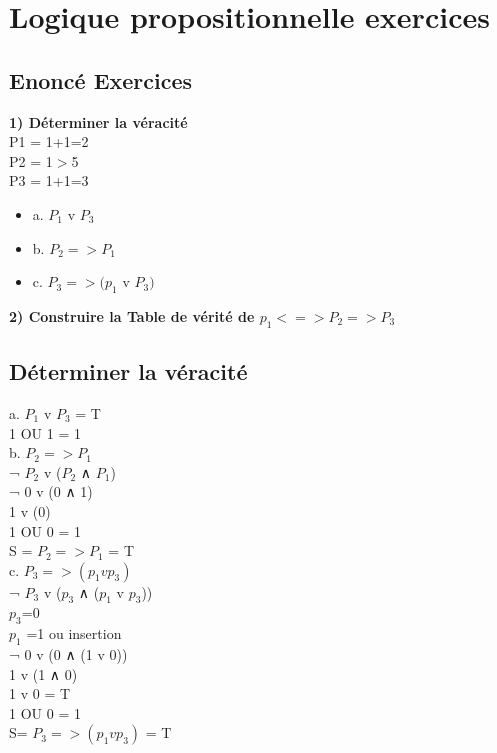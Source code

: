 \newpage

\chapter{Logique propositionnelle exercices}
\vspace{5mm} %

\section{Enoncé Exercices}

\textbf{1) Déterminer la véracité} \\

P1 = 1+1=2  \\
P2 = 1$>$5 \\
P3 = 1+1=3 \\

\begin{itemize}
\item {a. $P_1$ v $P_3$}
\item {b. $P_2 => P_1$}
\item {c. $P_3 => (p_1$ v $P_3)$}
\end{itemize}

\vspace{3mm}
\textbf{2) Construire la Table de vérité de $p_1 <=> P_2 => P_3$} \\

\vspace{5mm} %
\section{Déterminer la véracité}

a. $P_1$ v $P_3$ = T \\
1 OU 1 = 1\\

b. $P_2 => P_1$ \\
¬ $P_2$ v ($P_2$ ∧ $P_1$) \\
¬ 0 v (0 ∧ 1) \\
1 v (0) \\
1 OU 0 = 1\\
S = $P_2 => P_1$ = T \\

c. $P_3 => (p_1 v p_3)$ \\
¬ $P_3$ v ($p_3$ ∧ ($p_1$ v $p_3$)) \\
$p_3$=0 \\
$p_1$ =1 ou insertion \\
¬ 0 v (0 ∧ (1 v 0)) \\
1 v (1 ∧ 0) \\
1 v 0 = T \\
1 OU 0 = 1 \\
S= $P_3 => (p_1 v p_3)$ = T\\

